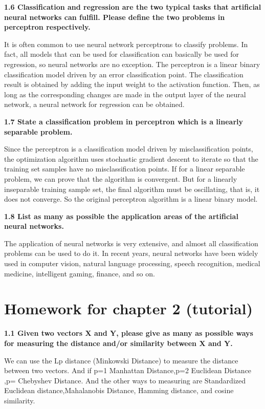 \noindent\textbf{1.6 Classification and regression are the two typical tasks that artificial neural networks can fulfill. Please define the two problems in perceptron respectively.}

\noindent It is often common to use neural network perceptrons to classify problems. In fact, all models that can be used for classification can basically be used for regression, so neural networks are no exception. The perceptron is a linear binary classification model driven by an error classification point. The classification result is obtained by adding the input weight to the activation function. Then, as long as the corresponding changes are made in the output layer of the neural network, a neural network for regression can be obtained.

\noindent \textbf{1.7 State a classification problem in perceptron which is a linearly separable problem.}

\noindent Since the perceptron is a classification model driven by misclassification points, the optimization algorithm uses stochastic gradient descent to iterate so that the training set samples have no misclassification points. If for a linear separable problem, we can prove that the algorithm is convergent. But for a linearly inseparable training sample set, the final algorithm must be oscillating, that is, it does not converge. So the original perceptron algorithm is a linear binary model.

\noindent\textbf{1.8 List as many as possible the application areas of the artificial neural networks.}

\noindent The application of neural networks is very extensive, and almost all classification problems can be used to do it. In recent years, neural networks have been widely used in computer vision, natural language processing, speech recognition, medical medicine, intelligent gaming, finance, and so on.


\newpage
\section{Homework for chapter 2 (tutorial)}
\noindent\textbf{1.1 Given two vectors X and Y, please give as many as possible ways for measuring the distance and/or similarity between X and Y.}

\noindent We can use the Lp distance (Minkowski Distance) to measure the distance between two vectors.
And if p=1  Manhattan Distance,p=2  Euclidean Distance ,p= Chebyshev Distance.
And the other ways to measuring are Standardized Euclidean distance,Mahalanobis Distance,
Hamming distance, and cosine similarity.


